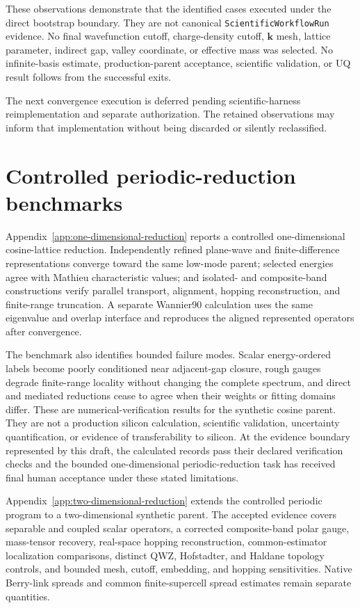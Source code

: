 These observations demonstrate that the identified cases executed under the
direct bootstrap boundary. They are not canonical
\texttt{ScientificWorkflowRun} evidence. No final wavefunction cutoff,
charge-density cutoff, $\mathbf k$ mesh, lattice parameter, indirect gap,
valley coordinate, or effective mass was selected. No infinite-basis estimate,
production-parent acceptance, scientific validation, or UQ result follows from
the successful exits.

The next convergence execution is deferred pending scientific-harness
reimplementation and separate authorization. The retained observations may
inform that implementation without being discarded or silently reclassified.

\section{Controlled periodic-reduction benchmarks}


Appendix~\ref{app:one-dimensional-reduction} reports a controlled
one-dimensional cosine-lattice reduction. Independently refined plane-wave and
finite-difference representations converge toward the same low-mode parent;
selected energies agree with Mathieu characteristic values; and isolated- and
composite-band constructions verify parallel transport, alignment, hopping
reconstruction, and finite-range truncation. A separate Wannier90 calculation
uses the same eigenvalue and overlap interface and reproduces the aligned
represented operators after convergence.

The benchmark also identifies bounded failure modes. Scalar energy-ordered
labels become poorly conditioned near adjacent-gap closure, rough gauges degrade
finite-range locality without changing the complete spectrum, and direct and
mediated reductions cease to agree when their weights or fitting domains differ.
These are numerical-verification results for the synthetic cosine parent. They
are not a production silicon calculation, scientific validation, uncertainty
quantification, or evidence of transferability to silicon. At the evidence
boundary represented by this draft, the calculated records pass their declared
verification checks and the bounded one-dimensional periodic-reduction task has
received final human acceptance under these stated limitations.

Appendix~\ref{app:two-dimensional-reduction} extends the controlled periodic
program to a two-dimensional synthetic parent. The accepted evidence covers
separable and coupled scalar operators, a corrected composite-band polar gauge,
mass-tensor recovery, real-space hopping reconstruction, common-estimator
localization comparisons, distinct QWZ, Hofstadter, and Haldane topology
controls, and bounded mesh, cutoff, embedding, and hopping sensitivities.
Native Berry-link spreads and common finite-supercell spread estimates remain
separate quantities.

